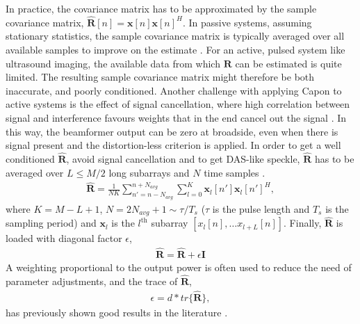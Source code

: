 \documentclass[journal]{IEEEtran}
\newcommand{\mat}[1]{\mathbf{#1}}
\renewcommand{\vec}[1]{\mathbf{#1}}
\begin{document}
In practice, the covariance matrix has to be approximated by the sample covariance matrix, $\mat{\hat{R}}[n] = \vec{x}[n]\vec{x}[n]^H$. In passive systems, assuming stationary statistics, the sample covariance matrix is typically averaged over all available samples to improve on the estimate \cite{Krima}. For an active, pulsed system like ultrasound imaging, the available data from which $\mat{R}$ can be estimated is quite limited. The resulting sample covariance matrix might therefore be both inaccurate, and poorly conditioned. Another challenge with applying Capon to active systems is the effect of signal cancellation, where high correlation between signal and interference favours weights that in the end cancel out the signal \cite{Synnevag2009a}. In this way, the beamformer output can be zero at broadside, even when there is signal present and the distortion-less criterion is applied. 
In order to get a well conditioned $\mat{\hat{R}}$, avoid signal cancellation and to get DAS-like speckle, $\mat{\hat{R}}$ has to be averaged over $L\le M/2$ long subarrays and $N$ time samples \cite{Synnevag2007, Synnevag2007a}.
\begin{align}
\mat{\hat{R}} = \frac{1}{NK}\sum_{n'=n-N_{avg}}^{n+N_{avg}} \sum_{l=0}^{K} \vec{x}_l[n']\vec{x}_l[n']^H,\label{eq:R}
\end{align}
where $K = M-L+1$, $N = 2N_{avg} + 1\sim \tau/T_s$ ($\tau$ is the pulse length and $T_s$ is the sampling period) and $\vec{x}_l$ is the $l^\text{th}$ subarray $[x_l[n], \dotso x_{l+L}[n]]$.
Finally, $\mat{\hat{R}}$ is loaded with diagonal factor $\epsilon$, 
\begin{align}
\mat{\hat{R}} = \mat{\hat{R}} + \epsilon\mat{I}
\end{align}
A weighting proportional to the output power is often used to reduce the need of parameter adjustments, and the trace of $\mat{\hat{R}}$, 
\begin{align}
\epsilon = d*tr\{\mat{\hat{R}}\},
\end{align}
has previously shown good results in the literature \cite{Synnevag2007}. 

\end{document}
